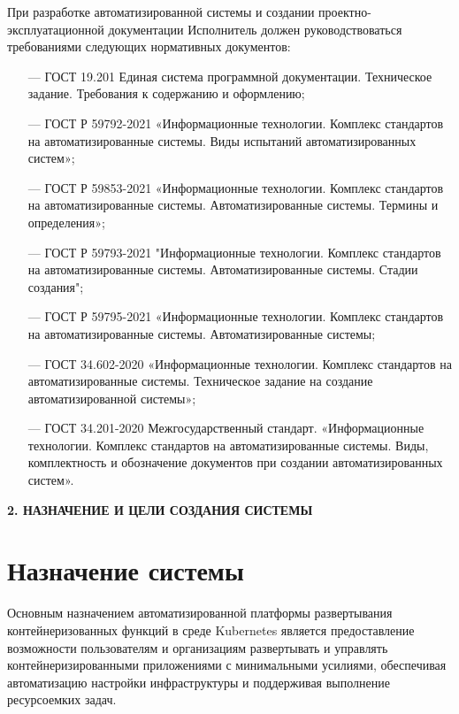 При разработке автоматизированной системы и создании проектно-
эксплуатационной документации Исполнитель должен руководствоваться
требованиями следующих нормативных документов:
\begin{itemize}
    \item[---]ГОСТ 19.201 Единая система программной документации. Техническое задание. Требования к содержанию и оформлению;
    \item[---]ГОСТ Р 59792-2021 «Информационные технологии. Комплекс стандартов на автоматизированные системы. Виды испытаний автоматизированных систем»;
    \item[---]ГОСТ Р 59853-2021 «Информационные технологии. Комплекс стандартов на автоматизированные системы. Автоматизированные системы. Термины и определения»;
    \item[---]ГОСТ Р 59793-2021 "Информационные технологии. Комплекс стандартов на автоматизированные системы. Автоматизированные системы. Стадии создания";
    \item[---]ГОСТ Р 59795-2021 «Информационные технологии. Комплекс стандартов на автоматизированные системы. Автоматизированные системы;
    \item[---]ГОСТ 34.602-2020 «Информационные технологии. Комплекс стандартов на автоматизированные системы. Техническое задание на создание автоматизированной системы»;
    \item[---]ГОСТ 34.201-2020 Межгосударственный стандарт. «Информационные технологии. Комплекс стандартов на автоматизированные системы. Виды, комплектность и обозначение документов при создании автоматизированных систем».
\end{itemize}

\newpage
\begin{center}
  \textbf{\large 2. НАЗНАЧЕНИЕ И ЦЕЛИ СОЗДАНИЯ СИСТЕМЫ}
\end{center}

\section{Назначение системы}

Основным назначением автоматизированной платформы развертывания контейнеризованных функций в среде Kubernetes является предоставление возможности пользователям и организациям развертывать и управлять контейнеризированными приложениями с минимальными усилиями, обеспечивая автоматизацию настройки инфраструктуры и поддерживая выполнение ресурсоемких задач.

